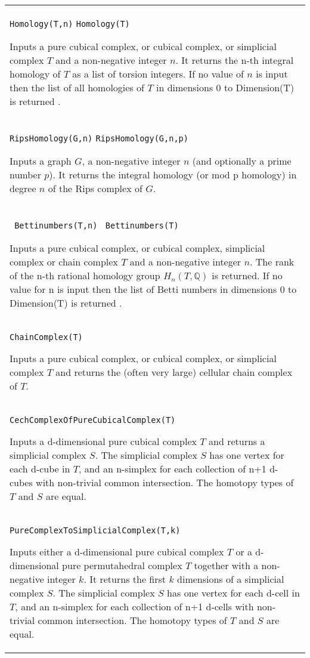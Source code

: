 \documentclass[a4paper,11pt]{report}
\begin{document}
{
 \begin{center}
\begin{tabular}{|l|} \texttt{Homology(T,n)} \texttt{Homology(T)} 

 Inputs a pure cubical complex, or cubical complex, or simplicial complex $T$ and a non-negative integer $n$. It returns the n-th integral homology of $T$ as a list of torsion integers. If no value of $n$ is input then the list of all homologies of $T$ in dimensions 0 to Dimension(T) is returned . \\
 \texttt{RipsHomology(G,n)} \texttt{RipsHomology(G,n,p)} 

 Inputs a graph $G$, a non-negative integer $n$ (and optionally a prime number $p$). It returns the integral homology (or mod p homology) in degree $n$ of the Rips complex of $G$. \\
 \index{Bettinumbers} \texttt{ Bettinumbers(T,n)} \texttt{ Bettinumbers(T)} 

 Inputs a pure cubical complex, or cubical complex, simplicial complex or chain
complex $T$ and a non-negative integer $n$. The rank of the n-th rational homology group $H_n(T,\mathbb Q)$ is returned. If no value for n is input then the list of Betti numbers in
dimensions 0 to Dimension(T) is returned . \\
 \texttt{ChainComplex(T)} 

 Inputs a pure cubical complex, or cubical complex, or simplicial complex $T$ and returns the (often very large) cellular chain complex of $T$. \\
 \index{CechComplexOfPureCubicalComplex} \texttt{CechComplexOfPureCubicalComplex(T)} 

 Inputs a d-dimensional pure cubical complex $T$ and returns a simplicial complex $S$. The simplicial complex $S$ has one vertex for each d-cube in $T$, and an n-simplex for each collection of n+1 d-cubes with non-trivial common
intersection. The homotopy types of $T$ and $S$ are equal. \\
 \index{PureComplexToSimplicialComplex} \texttt{PureComplexToSimplicialComplex(T,k)} 

 Inputs either a d-dimensional pure cubical complex $T$ or a d-dimensional pure permutahedral complex $T$ together with a non-negative integer $k$. It returns the first $k$ dimensions of a simplicial complex $S$. The simplicial complex $S$ has one vertex for each d-cell in $T$, and an n-simplex for each collection of n+1 d-cells with non-trivial common
intersection. The homotopy types of $T$ and $S$ are equal. 


\end{tabular}
\end{center}}
\end{document}
